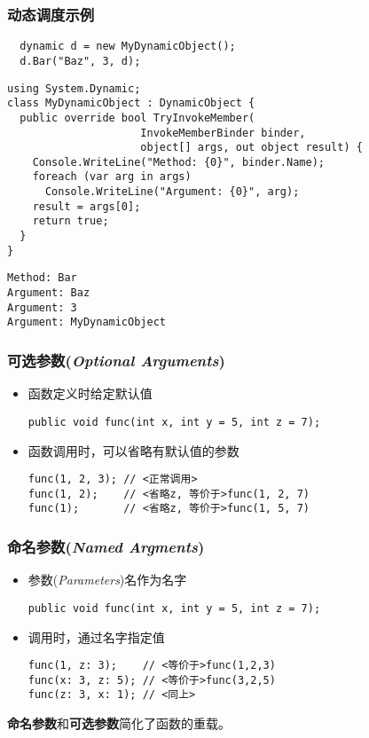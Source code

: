 \begin{frame}
\frametitle{动态调度示例}
\begin{lstlisting}
  dynamic d = new MyDynamicObject();
  d.Bar("Baz", 3, d);
\end{lstlisting}

\begin{lstlisting}
using System.Dynamic;
class MyDynamicObject : DynamicObject {
  public override bool TryInvokeMember(
                     InvokeMemberBinder binder,
                     object[] args, out object result) {
    Console.WriteLine("Method: {0}", binder.Name);
    foreach (var arg in args)
      Console.WriteLine("Argument: {0}", arg);
    result = args[0];
    return true;
  }
}
\end{lstlisting}

\begin{lstlisting}[language=Clean]
Method: Bar
Argument: Baz
Argument: 3
Argument: MyDynamicObject
\end{lstlisting}
\end{frame}


\begin{frame}[fragile]
\frametitle{可选参数(\textit{Optional Arguments})}
\begin{itemize}
\item 函数定义时给定默认值
\begin{lstlisting}
public void func(int x, int y = 5, int z = 7);
\end{lstlisting}
\item 函数调用时，可以省略有默认值的参数
\begin{lstlisting}[escapeinside=<>]
func(1, 2, 3); // <正常调用>
func(1, 2);    // <省略z, 等价于>func(1, 2, 7)
func(1);       // <省略z, 等价于>func(1, 5, 7)
\end{lstlisting}
\end{itemize}
\end{frame}

\begin{frame}[fragile]
\frametitle{命名参数(\textit{Named Argments})}
\begin{itemize}
\item 参数(\textit{Parameters})名作为名字
\begin{lstlisting}
public void func(int x, int y = 5, int z = 7);
\end{lstlisting}
\item 调用时，通过名字指定值
\begin{lstlisting}[escapeinside=<>]
func(1, z: 3);    // <等价于>func(1,2,3)
func(x: 3, z: 5); // <等价于>func(3,2,5)
func(z: 3, x: 1); // <同上>
\end{lstlisting}
\end{itemize}
\textbf{命名参数}和\textbf{可选参数}简化了函数的重载。
\end{frame}

